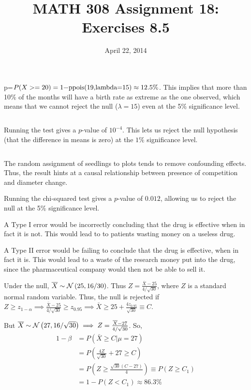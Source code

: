 \documentclass[twocolumn]{article}
\title{MATH 308 Assignment 18:\\Exercises 8.5}
\date{April 22, 2014}
\begin{document}
\maketitle

p=$P(X>=20)=\text{\code{1-ppois(19,lambda=15)}}\approx 12.5\%$. This implies that more than 10\% of the months will have a birth rate as extreme as the one observed, which means that we cannot reject the null ($\lambda=15$) even at the 5\% significance level.

\subsection{} Running the test gives a $p$-value of $10^{-4}$. This lets us reject the null hypothesis (that the difference in means is zero) at the $1\%$ significance level.
\subsection{} The random assignment of seedlings to plots tends to remove confounding effects. Thus, the result hints at a causal relationship between presence of competition and diameter change.

Running the chi-squared test gives a $p$-value of $0.012$, allowing us to reject the null at the 5\% significance level.

A Type I error would be incorrectly concluding that the drug is effective when in fact it is not. This would lead to to patients wasting money on a useless drug.

A Type II error would be failing to conclude that the drug is effective, when in fact it is. This would lead to a waste of the research money put into the drug, since the pharmaceutical company would then not be able to sell it.

Under the null, $\overline{X}\sim\mathcal{N}\left(25,16/30\right)$. Thus $Z=\frac{\bar X-25}{4/\sqrt{30}}$, where $Z$ is a standard normal random variable. Thus, the null is rejected if $Z\ge z_{1-\alpha}
\implies \frac{\bar X-25}{4/\sqrt{30}}\ge z_{0.95}\implies \bar X\ge 25+\frac{4z_{0.95}}{\sqrt{30}}\equiv C$.

But $\overline{X} \sim\mathcal{N}\left(27,16/\sqrt{30}\right)\implies Z=\frac{\overline{X}-27}{4/\sqrt{30}}$. So, \begin{align*}
	1-\beta&=P(\bar X\ge C|\mu=27)\\
	&=P\left(\frac{4Z}{\sqrt{30}}+27\ge C\right)\\
	&=P\left(Z\ge\frac{\sqrt{30}(C-27)}{4}\right)\equiv P(Z \ge C_1)\\
	&=1-P(Z<C_1)\approx 86.3\%
\end{align*}

\end{document}
